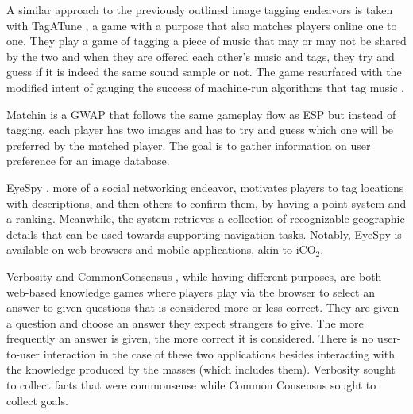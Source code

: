 \documentclass[preprint,authoryear,12pt]{elsarticle}
\makeatletter
\renewcommand{\paragraph}{\@startsection{paragraph}{4}{\z@}%
  {-3.25ex\@plus -1ex \@minus -.2ex}%
  {1.5ex \@plus .2ex}%
  {\normalfont\normalsize\mdseries}}
\makeatother
\begin{document}

A similar approach to the previously outlined image tagging endeavors is taken with TagATune \citep{Law:2009}, a game with a purpose that also matches players online one to one. They play a game of tagging a piece of music that may or may not be shared by the two and when they are offered each other's music and tags, they try and guess if it is indeed the same sound sample or not. The game resurfaced with the modified intent of gauging the success of machine-run algorithms that tag music \citep{vonAhn&Law:2009}.


Matchin \citep{Hacker:2009} is a GWAP that follows the same gameplay flow as ESP but instead of tagging, each player has two images and has to try and guess which one will be preferred by the matched player. The goal is to gather information on user preference for an image database.


EyeSpy \citep{Bell:2009}, more of a social networking endeavor, motivates players to tag locations with descriptions, and then others to confirm them, by having a point system and a ranking. Meanwhile, the system retrieves a collection of recognizable geographic details that can be used towards supporting navigation tasks. Notably, EyeSpy is available on web-browsers and mobile applications, akin to iCO$_2$.


Verbosity \citep{vonAhnVerb:2006} and CommonConsensus \citep{lieberman2007}, while having different purposes, are both web-based knowledge games where players play via the browser to select an answer to given questions that is considered more or less correct. They are given a question and choose an answer they expect strangers to give. The more frequently an answer is given, the more correct it is considered. There is no user-to-user interaction in the case of these two applications besides interacting with the knowledge produced by the masses (which includes them). Verbosity sought to collect facts that were commonsense while Common Consensus sought to collect goals.
\end{document}
